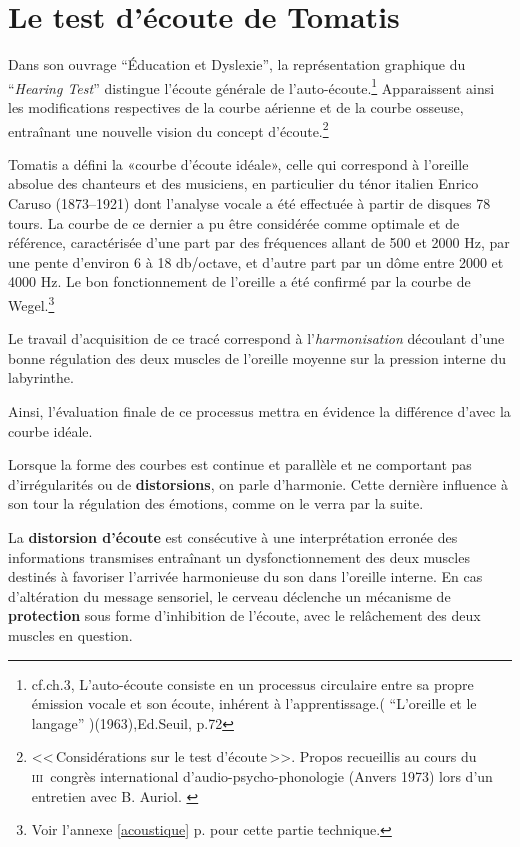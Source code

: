 
\section{Le test d'écoute de Tomatis}


Dans son ouvrage ``Éducation et
    Dyslexie''\autocite{tomatis:education}, la représentation graphique du 
 ``\emph{Hearing Test}'' distingue l'écoute générale de
 l'auto-écoute.\footnote{cf.ch.3, L'auto-écoute consiste en un processus
   circulaire entre sa propre  émission vocale et son écoute, inhérent
   à l'apprentissage.( ``L'oreille et le langage'' )(1963),Ed.Seuil,
   p.72}
 Apparaissent ainsi les modifications respectives
 de la courbe aérienne et de la courbe osseuse, entraînant une nouvelle vision
 du concept d'écoute.\footnote{<<\,Considérations sur le test d'écoute\,>>. Propos
  	recueillis au cours du \textsc{iii}\ieme\ congrès international
  	d'audio-psycho-phonologie (Anvers 1973) lors d'un entretien
        avec B. Auriol. \autocite{auriol_stress}}





Tomatis a défini la «courbe d'écoute idéale», celle qui correspond à l'oreille absolue
des chanteurs et des musiciens, en particulier du ténor italien Enrico
Caruso (1873--1921) dont l'analyse vocale a été effectuée à partir de
disques 78 tours. La courbe de ce dernier a pu être considérée comme
optimale et de référence, caractérisée d'une part par des fréquences allant de 500 et 2000
Hz, par une pente d\textquoteright environ 6 à 18 db/octave,
et d'autre part par un dôme entre 2000 et 4000 Hz.
Le bon fonctionnement de l'oreille a été confirmé par la courbe
de Wegel.\footnote{
		Voir l'annexe \ref{acoustique} p. \pageref{acoustique}
		 pour cette partie technique.}
               

Le travail d'acquisition de ce tracé correspond à l'\textsl{harmonisation}
découlant d'une bonne régulation des deux muscles de l'oreille moyenne
sur la pression interne du
labyrinthe.

Ainsi, l'évaluation finale de ce processus mettra en évidence la différence
d'avec la courbe idéale.

Lorsque la forme des 
courbes est continue et parallèle et ne comportant pas d'irrégularités ou
de \textbf{distorsions},
on parle d'harmonie.
Cette dernière influence à son tour 
la régulation des émotions, comme on le verra par la suite.



La \textbf{distorsion d'écoute} est consécutive à une interprétation
erronée des informations transmises entraînant un dysfonctionnement
des deux muscles destinés à favoriser l'arrivée
harmonieuse du son dans l'oreille interne.
En cas d'altération du message sensoriel,
le cerveau déclenche un mécanisme de\textbf{ protection} sous forme
d'inhibition de l'écoute, avec le relâchement des deux muscles en
question.



